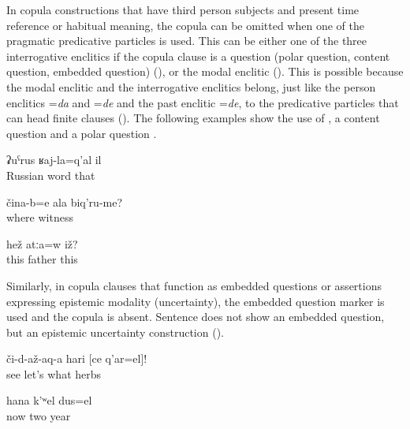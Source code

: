 In copula constructions that have third person subjects and present time reference or habitual meaning, the copula can be omitted when one of the pragmatic predicative particles is used. This can be either one of the three interrogative enclitics if the copula clause is a question (polar question, content question, embedded question) (), or the modal enclitic  (). This is possible because the modal enclitic and the interrogative enclitics belong, just like the person enclitics =\textit{da} and =\textit{de} and the past enclitic =\textit{de}, to the predicative particles that can head finite clauses (). The following examples show the use of  , a content question  and a polar question .
%
\begin{exe}
	\ex	\label{ex:‎That is a Russian word}
	\gll	ʡuˁrus	ʁaj-la=q'al	il\\
		Russian	word	that	\\
	\glt	{}

	\ex	\label{ex:Where are your witnesses}
	\gll	čina-b=e	ala	biq'ru-me?\\
		where		witness\\
	\glt	{}

	\ex	\label{ex:Is this the father}
	\gll	hež	atːa=w	iž?\\
		this	father	this\\
	\glt	{}
\end{exe}

Similarly, in copula clauses that function as embedded questions or assertions expressing epistemic modality (uncertainty), the embedded question marker is used  and the copula is absent. Sentence  does not show an embedded question, but an epistemic uncertainty construction ().
%
\begin{exe}
	\ex	\label{ex:‎Show what herbs these are}
	\gll	či-d-až-aq-a	hari	[ce	q'ar=el]!\\
		see	let's	what	herbs\\
	\glt	{}

	\ex	\label{ex:Now it is probably two years (that have passed by)}
	\gll	hana	k'ʷel	dus=el\\
		now	two	year\\
	\glt	{}
\end{exe}

